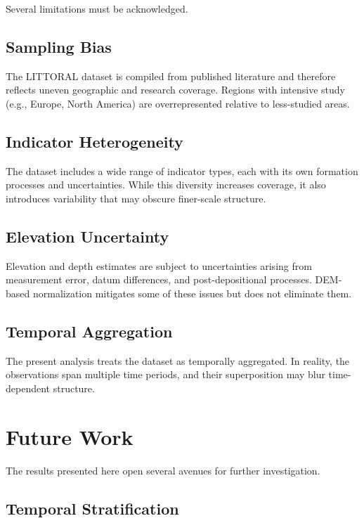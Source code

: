 \documentclass[twocolumn]{article}
\begin{document}
Several limitations must be acknowledged.

\subsection{Sampling Bias}

The LITTORAL dataset is compiled from published literature and therefore reflects uneven geographic and research coverage. Regions with intensive study (e.g., Europe, North America) are overrepresented relative to less-studied areas.

\subsection{Indicator Heterogeneity}

The dataset includes a wide range of indicator types, each with its own formation processes and uncertainties. While this diversity increases coverage, it also introduces variability that may obscure finer-scale structure.

\subsection{Elevation Uncertainty}

Elevation and depth estimates are subject to uncertainties arising from measurement error, datum differences, and post-depositional processes. DEM-based normalization mitigates some of these issues but does not eliminate them.

\subsection{Temporal Aggregation}

The present analysis treats the dataset as temporally aggregated. In reality, the observations span multiple time periods, and their superposition may blur time-dependent structure.

\section{Future Work}

The results presented here open several avenues for further investigation.

\subsection{Temporal Stratification}
\end{document}
